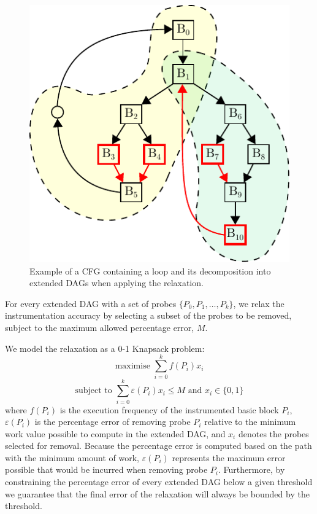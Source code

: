 \documentclass[sigplan,10pt]{acmart}
\begin{document}
\begin{figure}[h]
  \centering
  \includegraphics[scale=0.9]{figs/cfg-relax-example.pdf}
  \caption{Example of a CFG containing a loop and its decomposition into extended DAGs when applying the relaxation.}
  \label{fig:cfg-relax-example}
\end{figure}

For every extended DAG with a set of probes $\{P_0, P_1, \ldots, P_k\}$, we relax the instrumentation accuracy by selecting a subset of the probes to be removed, subject to the maximum allowed percentage error, $M$.

We model the relaxation as a 0-1 Knapsack problem:
\[
\textrm{maximise } \sum_{i=0}^{k} f(P_i)x_i
\]
\[
\textrm{subject to } \sum_{i=0}^{k} \varepsilon(P_i)x_i \leq M \textrm{ and } x_i\in\{0,1\}
\]
where $f(P_i)$ is the execution frequency of the instrumented basic block $P_i$, $\varepsilon(P_i)$ is the percentage error of removing probe $P_i$ relative to the minimum work value possible to compute in the extended DAG, and $x_i$ denotes the probes selected for removal.
Because the percentage error is computed based on the path with the minimum amount of work, $\varepsilon(P_i)$ represents the maximum error possible that would be incurred when removing probe $P_i$.
Furthermore, by constraining the percentage error of every extended DAG below a given threshold we guarantee that the final error of the relaxation will always be bounded by the threshold.
\end{document}
